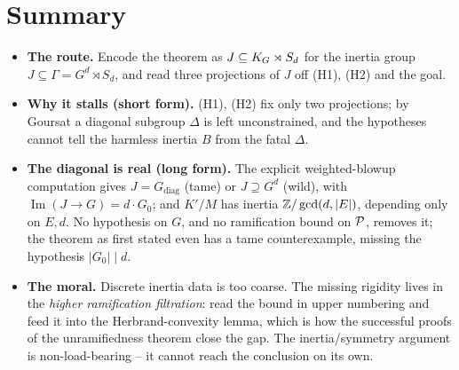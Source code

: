 \documentclass[11pt]{article}
\begin{document}
\section{Summary}\label{sec:summary}

\begin{itemize}
  \item \textbf{The route.} Encode the theorem as $J\subseteq K_{G}\rtimes S_d$ for
        the inertia group $J\subseteq\Gamma=G^d\rtimes S_d$, and read three
        projections of $J$ off (H1), (H2) and the goal.
  \item \textbf{Why it stalls (short form).} (H1), (H2) fix only two
        projections; by Goursat a diagonal subgroup $\Delta$ is left
        unconstrained, and the hypotheses cannot tell the harmless inertia $B$
        from the fatal $\Delta$.
  \item \textbf{The diagonal is real (long form).} The explicit weighted-blowup
        computation gives $J=G_{\mathrm{diag}}$ (tame) or $J\supseteq G^d$
        (wild), with $\operatorname{Im}(J\to G)=d\cdot G_0$; and $K'/M$ has
        inertia $\mathbb{Z}/\gcd(d,|E|)$, depending only on $E,d$. No hypothesis on $G$,
        and no ramification bound on $\mathcal{P}$, removes it; the theorem as first
        stated even has a tame counterexample, missing the hypothesis
        $|G_0|\mid d$.
  \item \textbf{The moral.} Discrete inertia data is too coarse. The missing
        rigidity lives in the \emph{higher ramification filtration}: read the
        bound in upper numbering and feed it into the Herbrand-convexity lemma,
        which is how the successful proofs of the unramifiedness theorem close
        the gap. The
        inertia/symmetry argument is non-load-bearing -- it cannot reach the
        conclusion on its own.
\end{itemize}

\printbibliography
\end{document}
